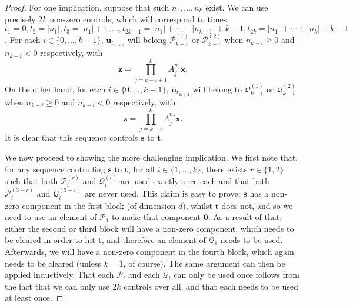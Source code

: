 \begin{proof}
For one implication, suppose that such $n_{1}, \ldots, n_{k}$ exist.
We can use precisely $2k$ non-zero controls, which will correspond to times
$t_{1} = 0,
t_{2} = \lvert n_{1}\rvert,
t_{3} = \lvert n_{1} \rvert +1,
\ldots,
t_{2k-1} = \lvert n_{1} \rvert + \cdots + \lvert n_{k-1} \rvert + k-1,
t_{2k} = \lvert n_{1} \rvert + \cdots + \lvert n_{k} \rvert + k-1$.
For each $i \in \lbrace 0, \ldots, k-1 \rbrace$, $\boldsymbol{u}_{t_{2i+1}}$ will belong $\mathcal{P}_{k-i}^{(1)}$ or $\mathcal{P}_{k-i}^{(2)}$ when $n_{k-i} \geq 0$ and $n_{k-i} < 0$ respectively, with
\begin{equation*}
  \boldsymbol{z} = \prod\limits_{j=k-i+1}^{k} A_{j}^{n_{j}} \boldsymbol{x}.
\end{equation*}
On the other hand, for each $i \in \lbrace 0, \ldots, k-1 \rbrace$, $\boldsymbol{u}_{t_{2i+2}}$ will belong to $\mathcal{Q}_{k-i}^{(1)}$ or $\mathcal{Q}_{k-i}^{(2)}$ when $n_{k-i} \geq 0$ and $n_{k-i} < 0$ respectively, with
\begin{equation*}
  \boldsymbol{z} = \prod\limits_{j=k-i}^{k} A_{j}^{n_{j}} \boldsymbol{x}.
\end{equation*}
It is clear that this sequence controls $\boldsymbol{s}$ to $\boldsymbol{t}$.

We now proceed to showing the more challenging implication. We first note that, for any sequence controlling $\boldsymbol{s}$ to $\boldsymbol{t}$,
for all $i \in \lbrace 1, \ldots, k \rbrace$,
there exists $r \in \lbrace 1, 2 \rbrace$ such that both $\mathcal{P}_{i}^{(r)}$ and $\mathcal{Q}_{i}^{(r)}$ are used exactly once each
and that both $\mathcal{P}_{i}^{(3-r)}$ and $\mathcal{Q}_{i}^{(3-r)}$ are never used.
This claim is easy to prove: $\boldsymbol{s}$ has a non-zero component in the first block (of dimension $d$), whilst $\boldsymbol{t}$ does not,
and so we need to use an element of $\mathcal{P}_{1}$ to make that component $\boldsymbol{0}$.
As a result of that, either the second or third block will have a non-zero component, which needs to be cleared in order to hit $\boldsymbol{t}$,
and therefore an element of $\mathcal{Q}_{1}$ needs to be used. Afterwards, we will have a non-zero component in the fourth block,
which again needs to be cleared (unless $k=1$, of course). The same argument can then be applied inductively.
That each $\mathcal{P}_{i}$ and each $\mathcal{Q}_{i}$ can only be used once follows from the fact that we can only use $2k$ controls over all,
and that each needs to be used at least once.


\end{proof}
